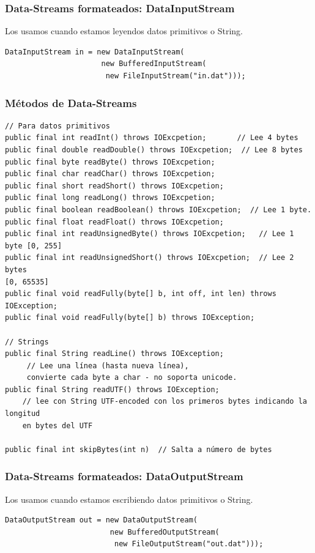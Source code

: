 \documentclass{beamer}
\begin{document}
\begin{frame}[fragile]
\frametitle{Data-Streams formateados: DataInputStream}
Los usamos cuando estamos leyendos datos primitivos o String.
\pause
\begin{verbatim}
DataInputStream in = new DataInputStream(
                      new BufferedInputStream(
                       new FileInputStream("in.dat")));
\end{verbatim}
\end{frame}

\begin{frame}[fragile]
\frametitle{Métodos de Data-Streams}
\begin{tiny}
\begin{verbatim}
// Para datos primitivos
public final int readInt() throws IOExcpetion;       // Lee 4 bytes 
public final double readDouble() throws IOExcpetion;  // Lee 8 bytes 
public final byte readByte() throws IOExcpetion;
public final char readChar() throws IOExcpetion;
public final short readShort() throws IOExcpetion;
public final long readLong() throws IOExcpetion;
public final boolean readBoolean() throws IOExcpetion;  // Lee 1 byte. 
public final float readFloat() throws IOExcpetion; 
public final int readUnsignedByte() throws IOExcpetion;   // Lee 1 byte [0, 255] 
public final int readUnsignedShort() throws IOExcpetion;  // Lee 2 bytes
[0, 65535]
public final void readFully(byte[] b, int off, int len) throws IOException;
public final void readFully(byte[] b) throws IOException;
 
// Strings
public final String readLine() throws IOException;
     // Lee una línea (hasta nueva línea), 
     convierte cada byte a char - no soporta unicode.
public final String readUTF() throws IOException;
    // lee con String UTF-encoded con los primeros bytes indicando la longitud
    en bytes del UTF
 
public final int skipBytes(int n)  // Salta a número de bytes
\end{verbatim}
\end{tiny}
\end{frame}

\begin{frame}[fragile]
\frametitle{Data-Streams formateados: DataOutputStream}
Los usamos cuando estamos escribiendo datos primitivos o String.
\pause
\begin{verbatim}
DataOutputStream out = new DataOutputStream(
                        new BufferedOutputStream(
                         new FileOutputStream("out.dat")));
\end{verbatim}
\end{frame}
\end{document}
